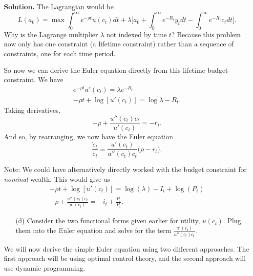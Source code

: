 \documentclass[11pt]{extarticle}
\theoremstyle{plain}
\theoremstyle{definition}
\begin{document}
\vspace{5mm}
\noindent
\textbf{Solution.} The Lagrangian would be
\begin{equation*}
	L(a_0) = \max \int_0^\infty e^{-\rho t} u(c_t) dt + \lambda \bigg[ a_0 + \int_0^\infty e^{-R_t} y_t dt - \int_0^\infty e^{-R_t} c_t dt \bigg].
\end{equation*}
Why is the Lagrange multiplier $\lambda$ not indexed by time $t$? Because this problem now only has one constraint (a lifetime constraint) rather than a sequence of constraints, one for each time period. 


So now we can derive the Euler equation directly from this lifetime budget constraint. We have 
\begin{gather*}
	e^{-\rho t} u'(c_t) = \lambda e^{-R_t} \\
	-\rho t + \log[u'(c_t)] = \log \lambda - R_t.
\end{gather*}
Taking derivatives, 
\begin{equation*}
	- \rho + \frac{ u''(c_t) \dot{c}_t}{u'(c_t)} = - r_t. 
\end{equation*}	
And so, by rearranging, we now have the Euler equation
\begin{equation*}
	\frac{\dot{c}_t}{c_t}= \frac{u'(c_t)}{ u''(c_t) c_t} \bigg(\rho - r_t \bigg).
\end{equation*}

Note: We could have alternatively directly worked with the budget constraint for \textit{nominal} wealth. This would give us
\begin{gather*}
	- \rho t + \log[u'(c_t)] = \log(\lambda) - I_t + \log (P_t) \\
	- \rho + \frac{u''(c_t) \dot{c}_t}{u'(c_t)} = - i_t + \frac{\dot{P}_t}{P_t}. 
\end{gather*}



\vspace{5mm}
\begin{enumerate}
	\item [(d)] Consider the two functional forms given earlier for utility, $u(c_t)$. Plug them into the Euler equation and solve for the term $\frac{u'(c_t)}{ u''(c_t) c_t}$.
\end{enumerate}



\vspace{6mm}
\noindent
We will now derive the simple Euler equation using two different approaches. The first approach will be using optimal control theory, and the second approach will use dynamic programming.
\end{document}
